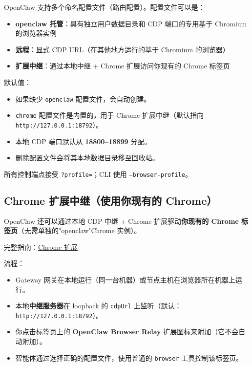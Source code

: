 OpenClaw 支持多个命名配置文件（路由配置）。配置文件可以是：

\begin{itemize}
  \item \textbf{openclaw 托管}：具有独立用户数据目录和 CDP 端口的专用基于 Chromium 的浏览器实例
  \item \textbf{远程}：显式 CDP URL（在其他地方运行的基于 Chromium 的浏览器）
  \item \textbf{扩展中继}：通过本地中继 + Chrome 扩展访问你现有的 Chrome 标签页
\end{itemize}


默认值：

\begin{itemize}
  \item 如果缺少 \texttt{openclaw} 配置文件，会自动创建。
  \item \texttt{chrome} 配置文件是内置的，用于 Chrome 扩展中继（默认指向 \texttt{http://127.0.0.1:18792}）。
  \item 本地 CDP 端口默认从 \textbf{18800–18899} 分配。
  \item 删除配置文件会将其本地数据目录移至回收站。
\end{itemize}


所有控制端点接受 \texttt{?profile=}；CLI 使用 \texttt{--browser-profile}。

\subsection{Chrome 扩展中继（使用你现有的 Chrome）}


OpenClaw 还可以通过本地 CDP 中继 + Chrome 扩展驱动\textbf{你现有的 Chrome 标签页}（无需单独的"openclaw"Chrome 实例）。

完整指南：\href{/tools/chrome-extension}{Chrome 扩展}

流程：

\begin{itemize}
  \item Gateway 网关在本地运行（同一台机器）或节点主机在浏览器所在机器上运行。
  \item 本地\textbf{中继服务器}在 loopback 的 \texttt{cdpUrl} 上监听（默认：\texttt{http://127.0.0.1:18792}）。
  \item 你点击标签页上的 \textbf{OpenClaw Browser Relay} 扩展图标来附加（它不会自动附加）。
  \item 智能体通过选择正确的配置文件，使用普通的 \texttt{browser} 工具控制该标签页。
\end{itemize}


